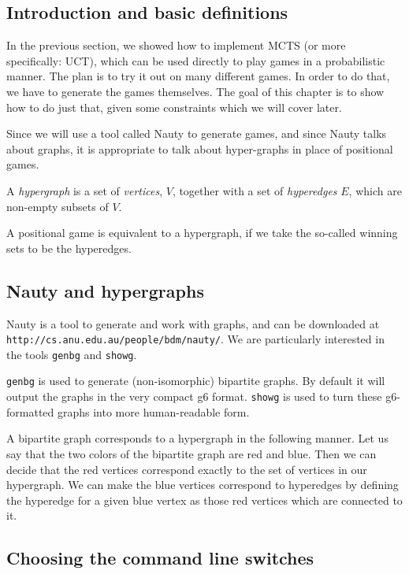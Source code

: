 \subsection{Introduction and basic definitions}

In the previous section, we showed how to implement MCTS (or more specifically: UCT), which can be used directly to play games in a probabilistic manner.
The plan is to try it out on many different games.
In order to do that, we have to generate the games themselves.
The goal of this chapter is to show how to do just that, given some constraints which we will cover later.

Since we will use a tool called Nauty to generate games, and since Nauty talks about graphs, it is appropriate to talk about hyper-graphs in place of positional games.

\begin{definition}
  A \emph{hypergraph} is a set of \emph{vertices}, $V$, together with a set of \emph{hyperedges} $E$, which are non-empty subsets of $V$.
\end{definition}

A positional game is equivalent to a hypergraph, if we take the so-called winning sets to be the hyperedges.

\subsection{Nauty and hypergraphs}


Nauty is a tool to generate and work with graphs, and can be downloaded at \texttt{http://cs.anu.edu.au/people/bdm/nauty/}.
We are particularly interested in the tools \texttt{genbg} and \texttt{showg}.

\texttt{genbg} is used to generate (non-isomorphic) bipartite graphs. By default it will output the graphs in the very compact g6 format.
\texttt{showg} is used to turn these g6-formatted graphs into more human-readable form.

A bipartite graph corresponds to a hypergraph in the following manner.
Let us say that the two colors of the bipartite graph are red and blue. Then we can decide that the red vertices correspond exactly to the set of vertices in our hypergraph.
We can make the blue vertices correspond to hyperedges by defining the hyperedge for a given blue vertex as those red vertices which are connected to it.


\subsection{Choosing the command line switches}
\label{sec:nautycommandline}

